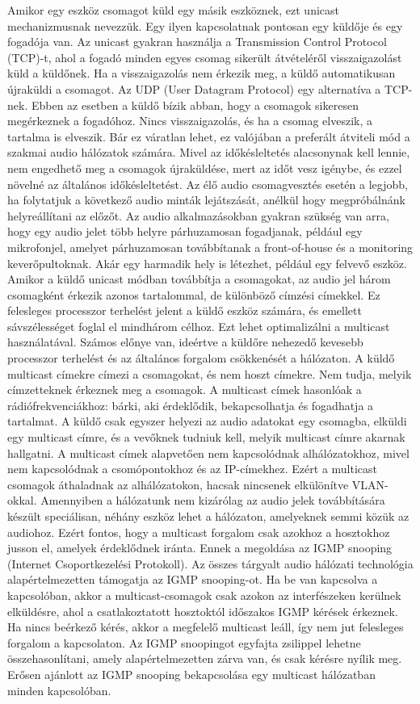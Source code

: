 Amikor egy eszköz csomagot küld egy másik eszköznek, ezt unicast mechanizmusnak
nevezzük. Egy ilyen kapcsolatnak pontosan egy küldője és egy fogadója van. Az
unicast gyakran használja a Transmission Control Protocol (TCP)-t, ahol a fogadó
minden egyes csomag sikerült átvételéről visszaigazolást küld a küldőnek. Ha a
visszaigazolás nem érkezik meg, a küldő automatikusan újraküldi a csomagot. 
Az UDP (User Datagram Protocol) egy alternatíva a TCP-nek. Ebben az esetben a küldő
bízik abban, hogy a csomagok sikeresen megérkeznek a fogadóhoz. Nincs
visszaigazolás, és ha a csomag elveszik, a tartalma is elveszik. Bár ez
váratlan lehet, ez valójában a preferált átviteli mód a szakmai audio hálózatok
számára. Mivel az időkésleltetés alacsonynak kell lennie, nem engedhető meg a
csomagok újraküldése, mert az időt vesz igénybe, és ezzel növelné az általános
időkésleltetést. Az élő audio csomagvesztés esetén a legjobb, ha folytatjuk a
következő audio minták lejátszását, anélkül hogy megpróbálnánk helyreállítani az
előzőt. Az audio alkalmazásokban gyakran szükség van arra, hogy egy audio jelet
több helyre párhuzamosan fogadjanak, például egy mikrofonjel, amelyet
párhuzamosan továbbítanak a front-of-house és a monitoring keverőpultoknak. Akár
egy harmadik hely is létezhet, például egy felvevő eszköz. 
Amikor a küldő unicast módban továbbítja a csomagokat, az audio jel három csomagként
érkezik azonos tartalommal, de különböző címzési címekkel. Ez felesleges
processzor terhelést jelent a küldő eszköz számára, és emellett sávszélességet
foglal el mindhárom célhoz. Ezt lehet optimalizálni a multicast használatával. 
Számos előnye van, ideértve a küldőre nehezedő kevesebb processzor terhelést 
és az általános forgalom csökkenését a hálózaton. 
A küldő multicast címekre címezi a csomagokat, és nem hoszt címekre. Nem tudja, melyik
címzetteknek érkeznek meg a csomagok. A multicast címek hasonlóak a
rádiófrekvenciákhoz: bárki, aki érdeklődik, bekapcsolhatja és fogadhatja a
tartalmat. A küldő csak egyszer helyezi az audio adatokat egy csomagba, elküldi
egy multicast címre, és a vevőknek tudniuk kell, melyik multicast címre akarnak
hallgatni. A multicast címek alapvetően nem kapcsolódnak alhálózatokhoz, mivel nem
kapcsolódnak a csomópontokhoz és az IP-címekhez. Ezért a multicast csomagok
áthaladnak az alhálózatokon, hacsak nincsenek elkülönítve VLAN-okkal. 
Amennyiben a hálózatunk nem kizárólag az audio jelek továbbítására 
készült speciálisan, néhány eszköz lehet a hálózaton, amelyeknek semmi közük az audiohoz.
Ezért fontos, hogy a multicast forgalom csak
azokhoz a hosztokhoz jusson el, amelyek érdeklődnek iránta. Ennek a megoldása az
IGMP snooping (Internet Csoportkezelési Protokoll). 
Az összes tárgyalt audio hálózati technológia alapértelmezetten
támogatja az IGMP snooping-ot. Ha be van kapcsolva a kapcsolóban, akkor a
multicast-csomagok csak azokon az interfészeken kerülnek elküldésre, ahol a
csatlakoztatott hosztoktól időszakos IGMP kérések érkeznek. Ha nincs beérkező
kérés, akkor a megfelelő multicast leáll, így nem jut felesleges forgalom a
kapcsolaton. Az IGMP snoopingot egyfajta zsilippel lehetne összehasonlítani,
amely alapértelmezetten zárva van, és csak kérésre nyílik meg. Erősen ajánlott
az IGMP snooping bekapcsolása egy multicast hálózatban minden kapcsolóban.


